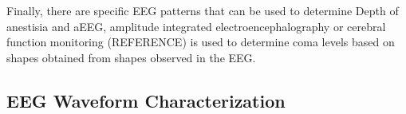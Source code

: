\documentclass[sensors,article,submit,moreauthors,pdftex,10pt,a4paper]{mdpi}
\begin{document}
Finally, there are specific EEG patterns that can be used to determine Depth of anestisia and aEEG, amplitude integrated electroencephalography or cerebral function monitoring (REFERENCE) is used to determine coma levels based on shapes obtained from shapes observed in the EEG.



%



\subsection{EEG Waveform Characterization}
\end{document}
